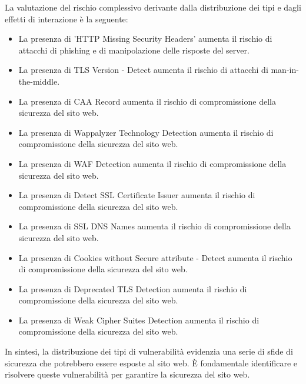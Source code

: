 La valutazione del rischio complessivo derivante dalla distribuzione dei tipi e dagli effetti di interazione è la seguente:
\begin{itemize}
\item La presenza di 'HTTP Missing Security Headers' aumenta il rischio di attacchi di phishing e di manipolazione delle risposte del server.
\item La presenza di TLS Version - Detect aumenta il rischio di attacchi di man-in-the-middle.
\item La presenza di CAA Record aumenta il rischio di compromissione della sicurezza del sito web.
\item La presenza di Wappalyzer Technology Detection aumenta il rischio di compromissione della sicurezza del sito web.
\item La presenza di WAF Detection aumenta il rischio di compromissione della sicurezza del sito web.
\item La presenza di Detect SSL Certificate Issuer aumenta il rischio di compromissione della sicurezza del sito web.
\item La presenza di SSL DNS Names aumenta il rischio di compromissione della sicurezza del sito web.
\item La presenza di Cookies without Secure attribute - Detect aumenta il rischio di compromissione della sicurezza del sito web.
\item La presenza di Deprecated TLS Detection aumenta il rischio di compromissione della sicurezza del sito web.
\item La presenza di Weak Cipher Suites Detection aumenta il rischio di compromissione della sicurezza del sito web.
\end{itemize}
In sintesi, la distribuzione dei tipi di vulnerabilità evidenzia una serie di sfide di sicurezza che potrebbero essere esposte al sito web. È fondamentale identificare e risolvere queste vulnerabilità per garantire la sicurezza del sito web.


